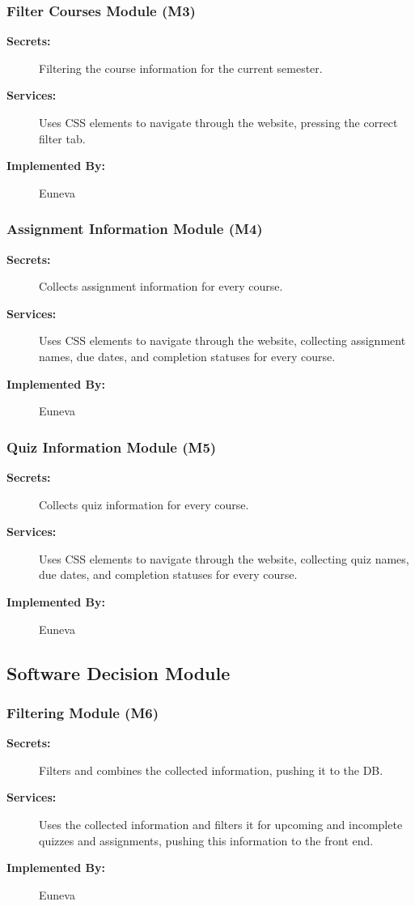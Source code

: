 \documentclass[12pt, titlepage]{article}
\begin{document}
\subsubsection{Filter Courses Module (M3)}
\begin{description}
    \item[\textbf{Secrets:}] Filtering the course information for the current semester.
    \item[\textbf{Services:}] Uses CSS elements to navigate through the website, pressing the correct filter tab.
    \item[\textbf{Implemented By:}] Euneva
\end{description}

\subsubsection{Assignment Information Module (M4)}
\begin{description}
    \item[\textbf{Secrets:}] Collects assignment information for every course.
    \item[\textbf{Services:}] Uses CSS elements to navigate through the website, collecting assignment names, due dates, and completion statuses for every course.
    \item[\textbf{Implemented By:}] Euneva
\end{description}

\subsubsection{Quiz Information Module (M5)}
\begin{description}
    \item[\textbf{Secrets:}] Collects quiz information for every course.
    \item[\textbf{Services:}] Uses CSS elements to navigate through the website, collecting quiz names, due dates, and completion statuses for every course.
    \item[\textbf{Implemented By:}] Euneva
\end{description}

\subsection{Software Decision Module}
\subsubsection{Filtering Module (M6)}
\begin{description}
    \item[\textbf{Secrets:}] Filters and combines the collected information, pushing it to the DB.
    \item[\textbf{Services:}] Uses the collected information and filters it for upcoming and incomplete quizzes and assignments, pushing this information to the front end.
    \item[\textbf{Implemented By:}] Euneva
\end{description}
\end{document}

